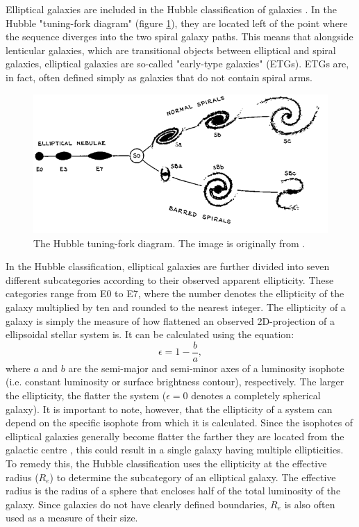 \documentclass[english, twoside]{HYgradu}
\begin{document}
Elliptical galaxies are included in the Hubble classification of galaxies \citep{Hubble1926}. In the Hubble "tuning-fork diagram" (figure \ref{figure:tuning_fork}), they are located left of the point where the sequence diverges into the two spiral galaxy paths. This means that alongside lenticular galaxies, which are transitional objects between elliptical and spiral galaxies, elliptical galaxies are so-called "early-type galaxies" (ETGs). ETGs are, in fact, often defined simply as galaxies that do not contain spiral arms.

\begin{figure}
	\centering
	\includegraphics[width=\textwidth]{TuningForkHubble.png}
	\caption{The Hubble tuning-fork diagram. The image is originally from \cite{Hubble1936}.}
	\label{figure:tuning_fork}
\end{figure}

In the Hubble classification, elliptical galaxies are further divided into seven different subcategories according to their observed apparent ellipticity. These categories range from E0 to E7, where the number denotes the ellipticity of the galaxy multiplied by ten and rounded to the nearest integer. The ellipticity of a galaxy is simply the measure of how flattened an observed 2D-projection of a ellipsoidal stellar system is. It can be calculated using the equation:
\begin{equation}
\epsilon = 1 - \frac{b}{a}, \label{eq:ellipticity}
\end{equation}
where $a$ and $b$ are the semi-major and semi-minor axes of a luminosity isophote (i.e. constant luminosity or surface brightness contour), respectively. The larger the ellipticity, the flatter the system ($\epsilon = 0$ denotes a completely spherical galaxy). It is important to note, however, that the ellipticity of a system can depend on the specific isophote from which it is calculated. Since the isophotes of elliptical galaxies generally become flatter the farther they are located from the galactic centre \citep{BinneyTremaine}, this could result in a single galaxy having multiple ellipticities. To remedy this, the Hubble classification uses the ellipticity at the effective radius ($R_e$) to determine the subcategory of an elliptical galaxy. The effective radius is the radius of a sphere that encloses half of the total luminosity of the galaxy. Since galaxies do not have clearly defined boundaries, $R_e$ is also often used as a measure of their size. 
\end{document}
